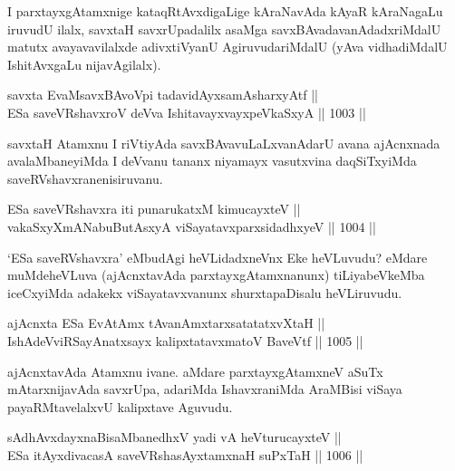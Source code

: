 \begin{artha}
I parxtayxgAtamxnige kataqRtAvxdigaLige kAraNavAda kAyaR kAraNagaLu iruvudU ilalx, savxtaH savxrUpadalilx asaMga savxBAvadavanAdadxriMdalU matutx avayavavilalxde adivxtiVyanU AgiruvudariMdalU (yAva vidhadiMdalU IshitAvxgaLu nijavAgilalx).
\end{artha}

\begin{shl}
savxta EvaMsavxBAvoV\s pi tadavidAyxsamAsharxyAtf || \\
ESa saveVRshavxroV deVva IshitavayxvayxpeVkaSxyA \hfill || 1003 ||  
\end{shl}

\begin{artha}
savxtaH Atamxnu I riVtiyAda savxBAvavuLaLxvanAdarU avana ajAcnxnada avalaMbaneyiMda I deVvanu tananx niyamayx vasutxvina daqSiTxyiMda saveRVshavxranenisiruvanu.
\end{artha}


\begin{shl}
ESa saveVRshavxra iti punarukatxM kimucayxteV || \\
vakaSxyXmANabuButAsxyA viSayatavxparxsidadhxyeV \hfill || 1004 ||  
\end{shl}

\begin{artha}
`ESa saveRVshavxra' eMbudAgi heVLidadxneVnx Eke heVLuvudu? eMdare muMdeheVLuva (ajAcnxtavAda parxtayxgAtamxnanunx) tiLiyabeVkeMba iceCxyiMda adakekx viSayatavxvanunx shurxtapaDisalu heVLiruvudu.
\end{artha}

\begin{shl}
ajAcnxta ESa EvA\s \s tAmx tAvanAmxtarxsatatatxvXtaH || \\
IshAdeVviRSayAnatxsayx kalipxtatavxmatoV BaveVtf \hfill || 1005 ||  
\end{shl}

\begin{artha}
ajAcnxtavAda Atamxnu ivane. aMdare parxtayxgAtamxneV aSuTx mAtarxnijavAda savxrUpa, adariMda IshavxraniMda AraMBisi viSaya payaRMtavelalxvU kalipxtave Aguvudu.
\end{artha}

\begin{shl}
sAdhAvxdayxnaBisaMbanedhxV yadi vA heVturucayxteV || \\
ESa itAyxdivacasA saveVRshasAyx\s \s tamxnaH suPxTaH \hfill || 1006 ||  
\end{shl}

